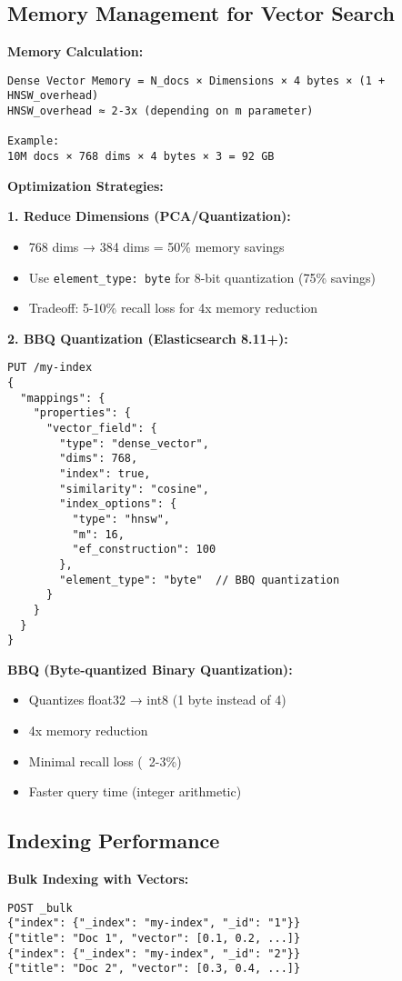 \documentclass[10pt]{article}
\begin{document}
\subsection{Memory Management for Vector Search}

\textbf{Memory Calculation:}
\begin{verbatim}
Dense Vector Memory = N_docs × Dimensions × 4 bytes × (1 + HNSW_overhead)
HNSW_overhead ≈ 2-3x (depending on m parameter)

Example:
10M docs × 768 dims × 4 bytes × 3 = 92 GB
\end{verbatim}

\textbf{Optimization Strategies:}

\textbf{1. Reduce Dimensions (PCA/Quantization):}
\begin{itemize}
\item 768 dims → 384 dims = 50\% memory savings
\item Use \texttt{element\_type: byte} for 8-bit quantization (75\% savings)
\item Tradeoff: 5-10\% recall loss for 4x memory reduction
\end{itemize}

\textbf{2. BBQ Quantization (Elasticsearch 8.11+):}
\begin{lstlisting}
PUT /my-index
{
  "mappings": {
    "properties": {
      "vector_field": {
        "type": "dense_vector",
        "dims": 768,
        "index": true,
        "similarity": "cosine",
        "index_options": {
          "type": "hnsw",
          "m": 16,
          "ef_construction": 100
        },
        "element_type": "byte"  // BBQ quantization
      }
    }
  }
}
\end{lstlisting}

\textbf{BBQ (Byte-quantized Binary Quantization):}
\begin{itemize}
\item Quantizes float32 → int8 (1 byte instead of 4)
\item 4x memory reduction
\item Minimal recall loss (~2-3\%)
\item Faster query time (integer arithmetic)
\end{itemize}

\subsection{Indexing Performance}

\textbf{Bulk Indexing with Vectors:}
\begin{lstlisting}
POST _bulk
{"index": {"_index": "my-index", "_id": "1"}}
{"title": "Doc 1", "vector": [0.1, 0.2, ...]}
{"index": {"_index": "my-index", "_id": "2"}}
{"title": "Doc 2", "vector": [0.3, 0.4, ...]}
\end{lstlisting}
\end{document}
